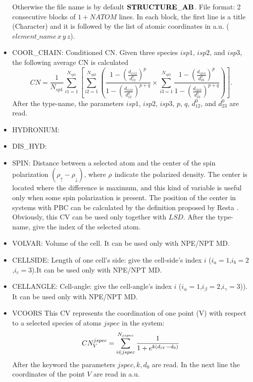 \documentclass[twoside,10pt,titlepage,a4paper]{article}
\begin{document}
\begin{itemize}
Otherwise the file name is by default ${\bf STRUCTURE\_AB}$.
File format: 2 consecutive blocks of $1+NATOM $ lines.
In each block, the first line is a title (Character) and it is
followed by the list of atomic coordinates in a.u. ($element\_name \, x \, y \, z$).
\item{COOR\_CHAIN:} Conditioned CN. Given three species
$isp1$, $isp2$, and $isp3$, the following average CN is calculated
\begin{equation}
CN = \frac{1}{N_{sp1}}\sum_{i1=1}^{N_{sp1}}\left[ \sum_{i2=1}^{N_{sp2}}\left(
\frac{1-\left(\frac{d_{i1i2}}{d_{12}^0}\right)^{p}}{1-\left(
\frac{d_{i1i2}}{d_{12}^0}\right)^{p+q}}\times \sum_{i3=1}^{N_{sp3}}
\frac{1-\left(\frac{d_{i2i3}}{d_{23}^0}\right)^{p}}{1-\left(
\frac{d_{i2i3}}{d_{23}^{0}}\right)^{p+q}}\right)\right].
\end{equation}
After the type-name, the parameters $isp1$, $isp2$, $isp3$, $p$, $q$, $d_{12}^0$,
and $d_{23}^0$ are read.
\item{HYDRONIUM:}
\item{DIS\_HYD:}
\item{SPIN:} Distance between a selected atom and the center of the spin
polarization $(\rho_{\uparrow} - \rho_{\downarrow})$, where $\rho_{}$
indicate the polarized density. The center is located where the difference
is maximum, and this kind of variable is useful only when some spin
polarization is present. The position of the center in systems with PBC
can be calculated by the definition proposed by Resta \cite{resta,berghold}.
Obviously, this CV can be used only together with $LSD$. After the type-name,
give the index of the selected atom.
\item{VOLVAR:} Volume of the cell. It can be used only with NPE/NPT MD.
\item{CELLSIDE:} Length of one cell's side: give the cell-side's index $i$
($i_a=1$,$i_b=2$,$i_c=3$).It can be used only with NPE/NPT MD.
\item{CELLANGLE:} Cell-angle: give the cell-angle's index $i$
($i_{\alpha}=1$,$i_{\beta}=2$,$i_{\gamma}=3$)). It can be used only 
with NPE/NPT MD.
\item{VCOORS}
This CV represents the coordination of one point (V) with respect to 
  a selected species of atoms $jspec$ in the system:
\begin{eqnarray}
CN^{jspec}_{V}=\sum^{N_{jspec}}_{i\in jspec}{1\over 1 + e^{k(d_{iV}-d_0)}}
\end{eqnarray}
After the keyword the parameters $jspec,k,d_0$ are read. In the next line 
the coordinates of the point $V$ are read in a.u.

\end{itemize}
\end{document}

